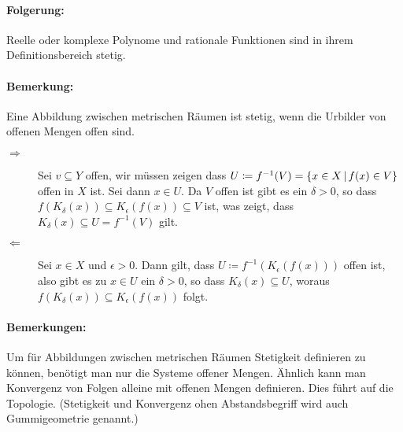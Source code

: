 \paragraph{Folgerung:}
Reelle oder komplexe Polynome und rationale Funktionen sind in ihrem Definitionsbereich stetig.
\paragraph{Bemerkung:}
Eine Abbildung zwischen metrischen Räumen ist stetig, wenn die Urbilder von offenen Mengen offen sind.
\beweis
\begin{description}
	\item[\glqq$\Rightarrow$\grqq] Sei $v\subseteq Y$ offen, wir müssen zeigen dass
	$U\coloneqq f^{-1}(V) =\left\{ x\in X \,\middle|\, f(x)\in V \right\}$ offen in $X$ ist.
	Sei dann $x\in U$. Da $V$ offen ist gibt es ein $\delta>0$, so dass $f(K_\delta(x))\subseteq K_\epsilon(f(x))\subseteq V$ ist, was zeigt, dass $K_\delta(x)\subseteq U = f^{-1}(V)$ gilt.

	\item[\glqq$\Leftarrow$\grqq] Sei $x\in X$ und $\epsilon>0$. Dann gilt, dass $U\coloneqq f^{-1}(K_\epsilon(f(x)))$ offen ist, also gibt es zu $x\in U$ ein $\delta>0$, so dass $K_\delta(x)\subseteq U$, woraus $f(K_\delta(x))\subseteq K_\epsilon(f(x))$ folgt.
\end{description}
\paragraph{Bemerkungen:}
Um für Abbildungen zwischen metrischen Räumen Stetigkeit definieren zu können, benötigt man nur die Systeme offener Mengen. Ähnlich kann man Konvergenz von Folgen alleine mit offenen Mengen definieren. Dies führt auf die Topologie. (Stetigkeit und Konvergenz ohen Abstandsbegriff wird auch Gummigeometrie genannt.)
